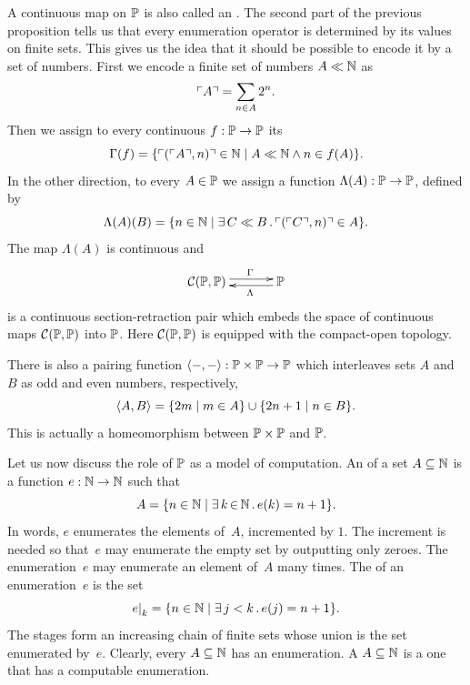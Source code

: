 A continuous map on $\mathbb{P}$ is also called an . The second part of the previous proposition tells us that
every enumeration operator is determined by its values on finite sets.
This gives us the idea that it should be possible to encode it by a
set of numbers. First we encode a finite set of numbers $A \ll \mathbb{N}$
as
%
\begin{equation*}
  \ulcorner A \urcorner = \sum_{n \in A} 2^n.
\end{equation*}
%
Then we assign to every continuous $f : \mathbb{P} \to \mathbb{P}$ its
%
\begin{equation*}
  \Gamma(f) = \{\ulcorner (\ulcorner A \urcorner, n) \urcorner \in \mathbb{N} \mid
    A \ll \mathbb{N} \land n \in f(A)
  \}.
\end{equation*}
%
In the other direction, to every $A \in \mathbb{P}$ we assign a function
$\Lambda(A) : \mathbb{P} \to \mathbb{P}$, defined by
%
\begin{equation*}
  \Lambda(A)(B) = \{n \in \mathbb{N} \mid
    \exists\, C \ll B\,.\,\ulcorner (\ulcorner C \urcorner, n) \urcorner \in A
  \}.
\end{equation*}
%
The map $\Lambda(A)$ is continuous and
%
\begin{equation*}
  \xymatrix{
    **[l]{\mathcal{C}(\Scott, \Scott)}
    \ar@<+0.25em>[r]^{\Gamma}
    &
    {\Scott}
    \ar@<+0.25em>[l]^{\Lambda}
  }
\end{equation*}
%
is a continuous section-retraction pair which embeds the space of
continuous maps $\mathcal{C}(\mathbb{P}, \mathbb{P})$ into $\mathbb{P}$. Here
$\mathcal{C}(\mathbb{P}, \mathbb{P})$ is equipped with the compact-open
topology.

There is also a pairing function $\langle {-}, {-} \rangle : \mathbb{P} \times
\mathbb{P} \to \mathbb{P}$ which interleaves sets $A$ and $B$ as odd and even
numbers, respectively,
%
\begin{equation*}
  \langle A, B \rangle = \{2 m \mid m \in A\} \cup \{2 n + 1 \mid n \in B\}.
\end{equation*}
%
This is actually a homeomorphism between $\mathbb{P} \times \mathbb{P}$ and
$\mathbb{P}$.

Let us now discuss the role of $\mathbb{P}$ as a model of computation. An
 of a set $A \subseteq \mathbb{N}$ is a function $e : \mathbb{N}
\to \mathbb{N}$ such that
%
\begin{equation*}
  A = \{n \in \mathbb{N} \mid \exists\, k \,{\in}\, \mathbb{N}\,.\,e(k) = n + 1\}.
\end{equation*}
%
In words, $e$ enumerates the elements of~$A$, incremented by $1$. The
increment is needed so that~$e$ may enumerate the empty set by
outputting only zeroes. The enumeration~$e$ may enumerate an element
of~$A$ many times. The  of an enumeration~$e$ is
the set
%
\begin{equation*}
  e{\mid}_{k} = \{n \in \mathbb{N} \mid \exists\, j < k\,.\,e(j) = n + 1\}.
\end{equation*}
%
The stages form an increasing chain of finite sets whose union is the
set enumerated by~$e$. Clearly, every $A \subseteq \mathbb{N}$ has an
enumeration. A  $A
\subseteq \mathbb{N}$ is a one that has a computable enumeration.

